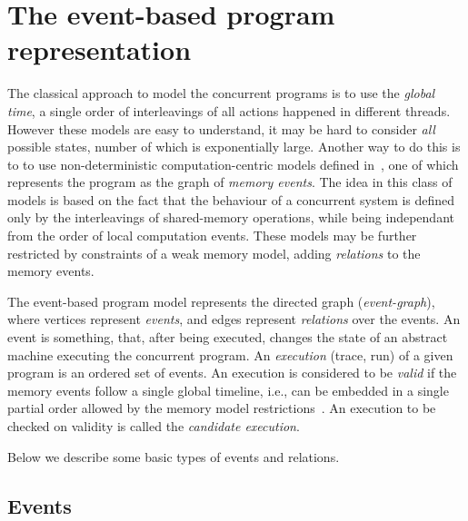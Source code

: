 
\section{The event-based program representation}
\label{ch:wmm:event}


The classical approach to model the concurrent programs is to use the \textit{global time}, a single order of interleavings of all actions happened in different threads. However these models are easy to understand, it may be hard to consider \textit{all} possible states, number of which is exponentially large. Another way to do this is to to use non-deterministic computation-centric models defined in~\cite{fri97}, one of which represents the program as the graph of \textit{memory events}. The idea in this class of models is based on the fact that the behaviour of a concurrent system is defined only by the interleavings of shared-memory operations, while being independant from the order of local computation events. These models may be further restricted by constraints of a weak memory model, adding \textit{relations} to the memory events.

The event-based program model represents the directed graph (\textit{event-graph}), where vertices represent \textit{events}, and edges represent \textit{relations} over the events. An event is something, that, after being executed, changes the state of an abstract machine executing the concurrent program. 
An \textit{execution} (trace, run) of a given program is an ordered set of events.
An execution is considered to be \textit{valid} if the memory events follow a single global timeline, i.e., can be embedded in a single partial order allowed by the memory model restrictions~\cite{alglave2010shared}. An execution to be checked on validity is called the \textit{candidate execution}.

Below we describe some basic types of events and relations.

\subsection{Events}
\label{ch:wmm:model:events}

